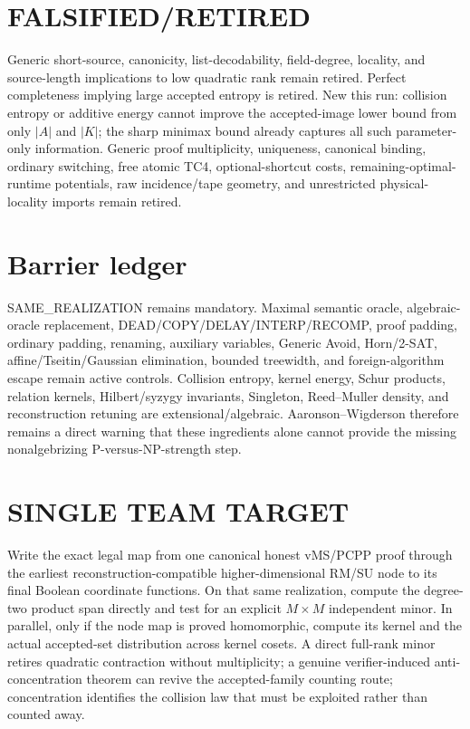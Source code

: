 \documentclass[11pt]{article}
\begin{document}
\section*{FALSIFIED/RETIRED}
Generic short-source, canonicity, list-decodability, field-degree, locality, and source-length implications to low quadratic rank remain retired. Perfect completeness implying large accepted entropy is retired. New this run: collision entropy or additive energy cannot improve the accepted-image lower bound from only $|A|$ and $|K|$; the sharp minimax bound already captures all such parameter-only information. Generic proof multiplicity, uniqueness, canonical binding, ordinary switching, free atomic TC4, optional-shortcut costs, remaining-optimal-runtime potentials, raw incidence/tape geometry, and unrestricted physical-locality imports remain retired.

\section*{Barrier ledger}
SAME\_REALIZATION remains mandatory. Maximal semantic oracle, algebraic-oracle replacement, DEAD/COPY/DELAY/INTERP/RECOMP, proof padding, ordinary padding, renaming, auxiliary variables, Generic Avoid, Horn/2-SAT, affine/Tseitin/Gaussian elimination, bounded treewidth, and foreign-algorithm escape remain active controls. Collision entropy, kernel energy, Schur products, relation kernels, Hilbert/syzygy invariants, Singleton, Reed--Muller density, and reconstruction retuning are extensional/algebraic. Aaronson--Wigderson therefore remains a direct warning that these ingredients alone cannot provide the missing nonalgebrizing P-versus-NP-strength step.

\section*{SINGLE TEAM TARGET}
Write the exact legal map from one canonical honest vMS/PCPP proof through the earliest reconstruction-compatible higher-dimensional RM/SU node to its final Boolean coordinate functions. On that same realization, compute the degree-two product span directly and test for an explicit $M\times M$ independent minor. In parallel, only if the node map is proved homomorphic, compute its kernel and the actual accepted-set distribution across kernel cosets. A direct full-rank minor retires quadratic contraction without multiplicity; a genuine verifier-induced anti-concentration theorem can revive the accepted-family counting route; concentration identifies the collision law that must be exploited rather than counted away.
\end{document}
